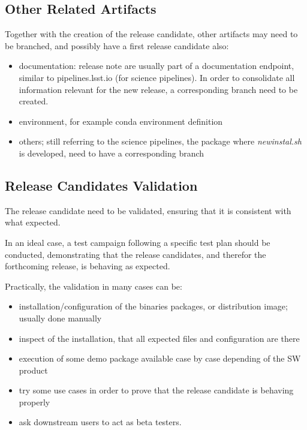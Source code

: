 \subsection{Other Related Artifacts}

Together with the creation of the release candidate, other artifacts may need to be branched, and possibly have a first release candidate also:

\begin{itemize}
\item documentation: release note are usually part of a documentation endpoint, similar to pipelines.lsst.io (for science pipelines). In order to consolidate all information relevant for the new release, a corresponding branch need to be created.
\item environment, for example conda environment definition
\item others; still referring to the science pipelines, the package where \textit{newinstal.sh} is developed, need to have a corresponding branch
\end{itemize}


\subsection{Release Candidates Validation} \label{sect:rcvalidation}

The release candidate need to be validated, ensuring that it is consistent with what expected.

In an ideal case, a test campaign following a specific test plan should be conducted, demonstrating that the release candidates, and therefor the forthcoming release, is behaving as expected.

Practically, the validation in many cases can be:

\begin{itemize}
\item installation/configuration of the binaries packages, or distribution image; usually done manually
\item inspect of the installation, that all expected files and configuration are there
\item execution of some demo package available case by case depending of the SW product
\item try some use cases in order to prove that the release candidate is behaving properly
\item ask downstream users to act as beta testers.
\end{itemize}

